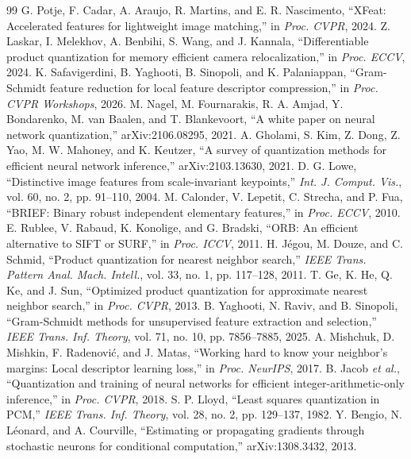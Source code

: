 \documentclass[10pt,conference]{IEEEtran}
\begin{document}
\begin{thebibliography}{99}
\footnotesize
{} G. Potje, F. Cadar, A. Araujo, R. Martins, and E. R. Nascimento, ``XFeat: Accelerated features for lightweight image matching,'' in \emph{Proc. CVPR}, 2024.
 Z. Laskar, I. Melekhov, A. Benbihi, S. Wang, and J. Kannala, ``Differentiable product quantization for memory efficient camera relocalization,'' in \emph{Proc. ECCV}, 2024.
 K. Safavigerdini, B. Yaghooti, B. Sinopoli, and K. Palaniappan, ``Gram-Schmidt feature reduction for local feature descriptor compression,'' in \emph{Proc. CVPR Workshops}, 2026.
 M. Nagel, M. Fournarakis, R. A. Amjad, Y. Bondarenko, M. van Baalen, and T. Blankevoort, ``A white paper on neural network quantization,'' arXiv:2106.08295, 2021.
 A. Gholami, S. Kim, Z. Dong, Z. Yao, M. W. Mahoney, and K. Keutzer, ``A survey of quantization methods for efficient neural network inference,'' arXiv:2103.13630, 2021.
 D. G. Lowe, ``Distinctive image features from scale-invariant keypoints,'' \emph{Int. J. Comput. Vis.}, vol. 60, no. 2, pp. 91--110, 2004.
 M. Calonder, V. Lepetit, C. Strecha, and P. Fua, ``BRIEF: Binary robust independent elementary features,'' in \emph{Proc. ECCV}, 2010.
 E. Rublee, V. Rabaud, K. Konolige, and G. Bradski, ``ORB: An efficient alternative to SIFT or SURF,'' in \emph{Proc. ICCV}, 2011.
 H. J\'egou, M. Douze, and C. Schmid, ``Product quantization for nearest neighbor search,'' \emph{IEEE Trans. Pattern Anal. Mach. Intell.}, vol. 33, no. 1, pp. 117--128, 2011.
 T. Ge, K. He, Q. Ke, and J. Sun, ``Optimized product quantization for approximate nearest neighbor search,'' in \emph{Proc. CVPR}, 2013.
 B. Yaghooti, N. Raviv, and B. Sinopoli, ``Gram-Schmidt methods for unsupervised feature extraction and selection,'' \emph{IEEE Trans. Inf. Theory}, vol. 71, no. 10, pp. 7856--7885, 2025.
 A. Mishchuk, D. Mishkin, F. Radenovi\'c, and J. Matas, ``Working hard to know your neighbor's margins: Local descriptor learning loss,'' in \emph{Proc. NeurIPS}, 2017.
 B. Jacob \emph{et al.}, ``Quantization and training of neural networks for efficient integer-arithmetic-only inference,'' in \emph{Proc. CVPR}, 2018.
 S. P. Lloyd, ``Least squares quantization in PCM,'' \emph{IEEE Trans. Inf. Theory}, vol. 28, no. 2, pp. 129--137, 1982.
 Y. Bengio, N. L\'eonard, and A. Courville, ``Estimating or propagating gradients through stochastic neurons for conditional computation,'' arXiv:1308.3432, 2013.

\end{thebibliography}
\end{document}
